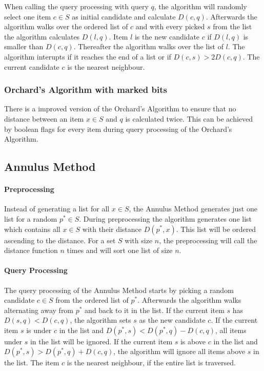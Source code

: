 \documentclass[runningheads,a4paper]{llncs}
\begin{document}
When calling the query processing with query $q$, the algorithm will randomly select one item $c \in S$ as initial
candidate and calculate $D(c, q)$. Afterwards the algorithm walks over the ordered list of $c$ and with every picked $s$
from the list the algorithm calculates $D(l, q)$. Item $l$ is the new candidate $c$ if $D(l, q)$ is smaller than
$D(c, q)$. Thereafter the algorithm walks over the list of $l$. The algorithm interupts if it reaches the end of a list
or if $D(c, s) > 2D(c, q)$. The current candidate $c$ is the nearest neighbour.

\subsubsection{Orchard’s Algorithm with marked bits}

There is a improved version of the Orchard’s Algorithm to ensure that no distance between an item $x \in S$ and $q$
is calculated twice. This can be achieved by boolean flags for every item during query processing of the Orchard’s
Algorithm.

\subsection{Annulus Method}

\paragraph{Preprocessing}

Instead of generating a list for all $x \in S$, the Annulus Method generates just one list for a random $p^* \in S$.
During preprocessing the algorithm generates one list which contains all $x \in S$ with their distance $D(p^*, x)$. This
list will be ordered ascending to the distance. For a set $S$ with size $n$, the preprocessing will call the distance
function $n$ times and will sort one list of size $n$.

\paragraph{Query Processing}

The query processing of the Annulus Method starts by picking a random candidate $c \in S$ from the ordered list of
$p^*$. Afterwards the algorithm walks alternating away from $p^*$ and back to it in the list. If the current item $s$
has $D(s, q) < D(c, q)$, the algorithm sets $s$ as the new candidate $c$. If the current item $s$ is under $c$ in the
list and $D(p^*, s) < D(p^*, q) - D(c, q)$, all items under $s$ in the list will be ignored. If the current
item $s$ is above $c$ in the list and $D(p^*, s) > D(p^*, q) + D(c, q)$, the algorithm will ignore all items above
$s$ in the list. The item $c$ is the nearest neighbour, if the entire list is traversed.
\end{document}
